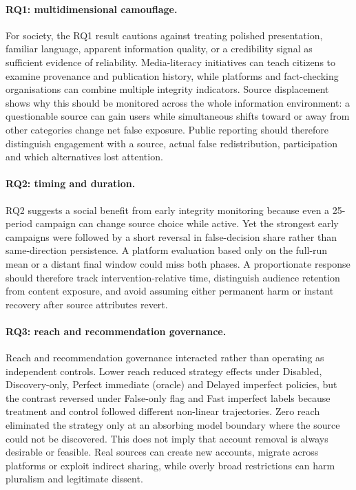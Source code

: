 \paragraph{RQ1: multidimensional camouflage.} For society, the RQ1 result cautions against treating polished presentation, familiar language, apparent information quality, or a credibility signal as sufficient evidence of reliability. Media-literacy initiatives can teach citizens to examine provenance and publication history, while platforms and fact-checking organisations can combine multiple integrity indicators. Source displacement shows why this should be monitored across the whole information environment: a questionable source can gain users while simultaneous shifts toward or away from other categories change net false exposure. Public reporting should therefore distinguish engagement with a source, actual false redistribution, participation and which alternatives lost attention.

\paragraph{RQ2: timing and duration.} RQ2 suggests a social benefit from early integrity monitoring because even a 25-period campaign can change source choice while active. Yet the strongest early campaigns were followed by a short reversal in false-decision share rather than same-direction persistence. A platform evaluation based only on the full-run mean or a distant final window could miss both phases. A proportionate response should therefore track intervention-relative time, distinguish audience retention from content exposure, and avoid assuming either permanent harm or instant recovery after source attributes revert.

\paragraph{RQ3: reach and recommendation governance.} Reach and recommendation governance interacted rather than operating as independent controls. Lower reach reduced strategy effects under Disabled, Discovery-only, Perfect immediate (oracle) and Delayed imperfect policies, but the contrast reversed under False-only flag and Fast imperfect labels because treatment and control followed different non-linear trajectories. Zero reach eliminated the strategy only at an absorbing model boundary where the source could not be discovered. This does not imply that account removal is always desirable or feasible. Real sources can create new accounts, migrate across platforms or exploit indirect sharing, while overly broad restrictions can harm pluralism and legitimate dissent.

